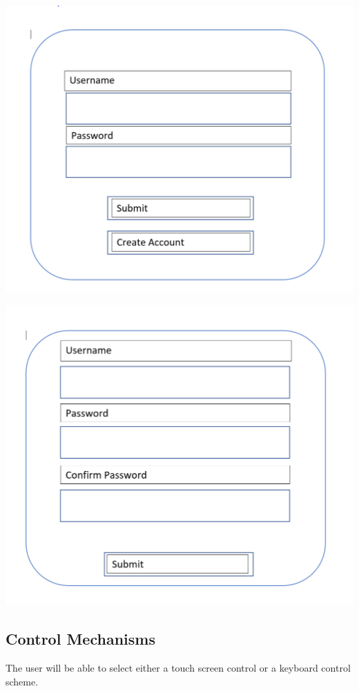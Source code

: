 \documentclass{article}
\begin{document}
\begin{minipage}{0.5\textwidth}
\includegraphics[width=\linewidth]{loginscreen}
\end{minipage} \hfill
\begin{minipage}{0.5\textwidth}
\includegraphics[width=\linewidth]{createaccount}
\end{minipage} \hfill

\subsection{Control Mechanisms}
The user will be able to select either a touch screen control or a keyboard control scheme.
 
\end{document}
